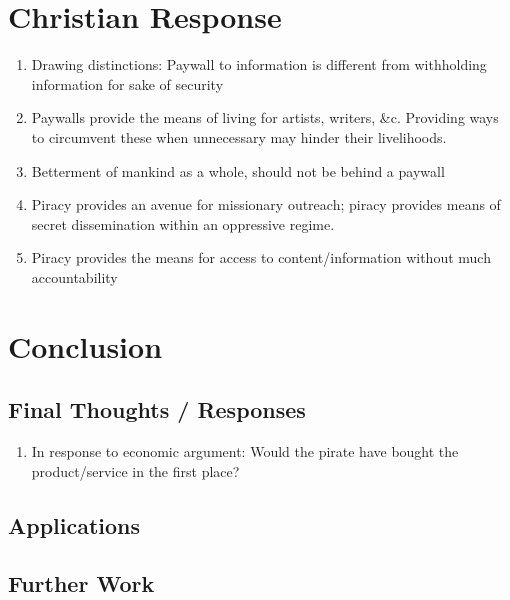 \documentclass[onecolumn, 12pt]{article}
\begin{document}
\section{Christian Response}

\begin{enumerate}
  \item Drawing distinctions: Paywall to information is different from
    withholding information for sake of security

  \item Paywalls provide the means of living for artists, writers, \&c. Providing
    ways to circumvent these when unnecessary may hinder their livelihoods.

  \item Betterment of mankind as a whole, should not be behind a paywall

  \item Piracy provides an avenue for missionary outreach; piracy provides
    means of secret dissemination within an oppressive regime.

  \item Piracy provides the means for access to content/information without
    much accountability
\end{enumerate}

\section{Conclusion}

\subsection{Final Thoughts / Responses}

\begin{enumerate}
  \item In response to economic argument: Would the pirate have bought the
    product/service in the first place?
\end{enumerate}

\subsection{Applications}

\subsection{Further Work}

\clearpage
\nocite{*}
\printbibliography
\end{document}
